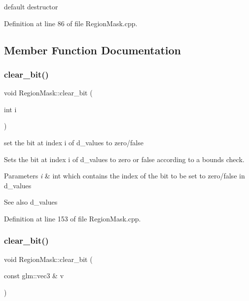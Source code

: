 default destructor 



Definition at line 86 of file Region\+Mask.\+cpp.



\subsection{Member Function Documentation}
\mbox{\label{class_region_mask_ac867580822cbae6a64a984be88e6a2b8}} 
\subsubsection{\texorpdfstring{clear\_bit()}{clear\_bit()}\hspace{0.1cm}{\footnotesize\ttfamily [1/2]}}
{\footnotesize\ttfamily void Region\+Mask\+::clear\+\_\+bit (\begin{DoxyParamCaption}\item[{int}]{i }\end{DoxyParamCaption})}



set the bit at index i of d\+\_\+values to zero/false 

Sets the bit at index i of d\+\_\+values to zero or false according to a bounds check.


\begin{DoxyParams}{Parameters}
{\em i} & int which contains the index of the bit to be set to zero/false in d\+\_\+values\\
\hline
\end{DoxyParams}
\begin{DoxySeeAlso}{See also}
d\+\_\+values 
\end{DoxySeeAlso}


Definition at line 153 of file Region\+Mask.\+cpp.

\mbox{\label{class_region_mask_ac561c2fda2080886c1ad98633e2b9851}} 
\subsubsection{\texorpdfstring{clear\_bit()}{clear\_bit()}\hspace{0.1cm}{\footnotesize\ttfamily [2/2]}}
{\footnotesize\ttfamily void Region\+Mask\+::clear\+\_\+bit (\begin{DoxyParamCaption}\item[{const glm\+::vec3 \&}]{v }\end{DoxyParamCaption})}



